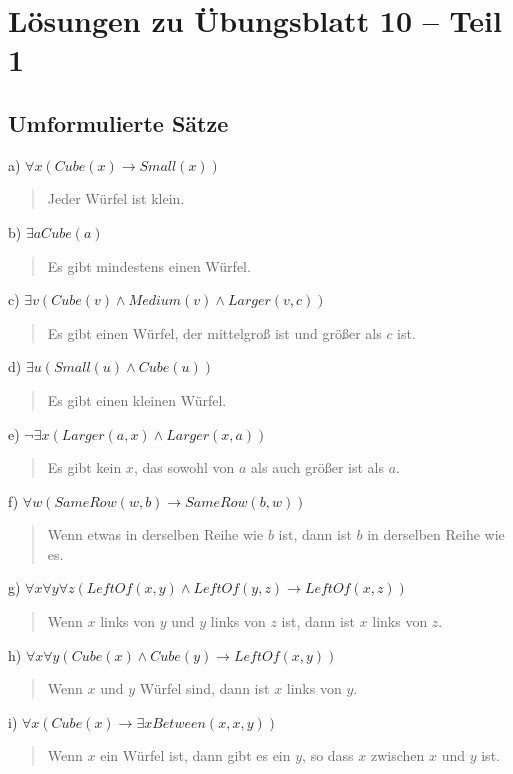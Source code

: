 \documentclass{article}
\begin{document}
\section*{Lösungen zu Übungsblatt 10 – Teil 1}
\subsection*{Umformulierte Sätze}

a) \(\forall x (Cube(x) \rightarrow Small(x))\)
   \begin{quote}
   Jeder Würfel ist klein.
   \end{quote}
b) \(\exists a Cube(a)\)
   \begin{quote}
   Es gibt mindestens einen Würfel.
   \end{quote}
c) \(\exists v (Cube(v) \land Medium(v) \land Larger(v, c))\)
   \begin{quote}
   Es gibt einen Würfel, der mittelgroß ist und größer als \(c\) ist.
   \end{quote}
d) \(\exists u (Small(u) \land Cube(u))\)
   \begin{quote}
   Es gibt einen kleinen Würfel.
   \end{quote}
e) \(\neg \exists x (Larger(a, x) \land Larger(x, a))\)
   \begin{quote}
   Es gibt kein \(x\), das sowohl von \(a\) als auch größer ist als \(a\).
   \end{quote}
f) \(\forall w (SameRow(w, b) \rightarrow SameRow(b, w))\)
   \begin{quote}
   Wenn etwas in derselben Reihe wie \(b\) ist, dann ist \(b\) in derselben Reihe wie es.
   \end{quote}
g) \(\forall x \forall y \forall z (LeftOf(x, y) \land LeftOf(y, z) \rightarrow LeftOf(x, z))\)
   \begin{quote}
   Wenn \(x\) links von \(y\) und \(y\) links von \(z\) ist, dann ist \(x\) links von \(z\).
   \end{quote}
h) \(\forall x \forall y (Cube(x) \land Cube(y) \rightarrow LeftOf(x, y))\)
   \begin{quote}
   Wenn \(x\) und \(y\) Würfel sind, dann ist \(x\) links von \(y\).
   \end{quote}
i) \(\forall x (Cube(x) \rightarrow \exists x Between(x, x, y))\)
   \begin{quote}
   Wenn \(x\) ein Würfel ist, dann gibt es ein \(y\), so dass \(x\) zwischen \(x\) und \(y\) ist.
   \end{quote}
\end{document}

